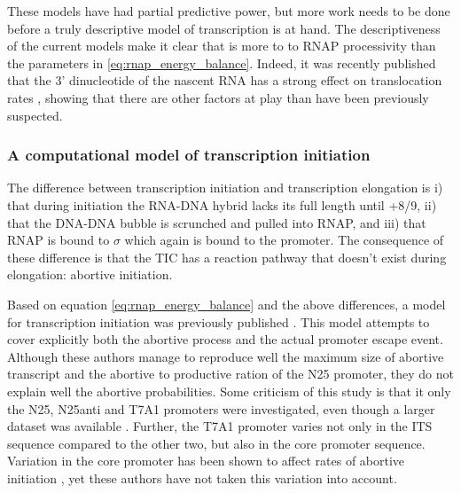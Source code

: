 These models have had partial predictive power, but more work needs to be done
before a truly descriptive model of transcription is at hand. The
descriptiveness of the current models make it clear that is more to to RNAP
processivity than the parameters in \eqref{eq:rnap_energy_balance}.  Indeed, it
was recently published that the 3' dinucleotide of the nascent RNA has a strong
effect on translocation rates \cite{hein_rna_2011}, showing that there are
other factors at play than have been previously suspected.

\subsubsection{A computational model of transcription initiation}
The difference between transcription initiation and transcription elongation is
i) that during initiation the RNA-DNA hybrid lacks its full length until +8/9,
ii) that the DNA-DNA bubble is scrunched and pulled into RNAP, and iii) that
RNAP is bound to $\sigma$ which again is bound to the promoter. The consequence
of these difference is that the TIC has a reaction pathway that doesn't exist
during elongation: abortive initiation.

Based on equation \eqref{eq:rnap_energy_balance} and the above differences, a
model for transcription initiation was previously published
\cite{xue_kinetic_2008}. This model attempts to cover explicitly both the
abortive process and the actual promoter escape event. Although these authors
manage to reproduce well the maximum size of abortive transcript and the
abortive to productive ration of the N25 promoter, they do not explain well the
abortive probabilities. Some criticism of this study is that it only the N25,
N25anti and T7A1 promoters were investigated, even though a larger dataset was
available \cite{hsu_initial_2006}. Further, the T7A1 promoter varies not only
in the ITS sequence compared to the other two, but also in the core promoter
sequence. Variation in the core promoter has been shown to affect rates of
abortive initiation \cite{vo_vitro_2003-1}, yet these authors have not taken
this variation into account.
